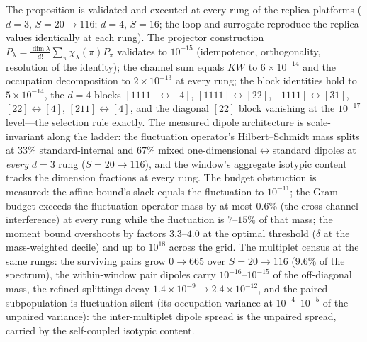The proposition is validated and executed at every rung of the replica
platforms ($d=3$, $S=20\to116$; $d=4$, $S=16$; the loop and surrogate
reproduce the replica values identically at each rung). The projector
construction $P_{\lambda}=\tfrac{\dim\lambda}{d!}\sum_{\pi}
\chi_{\lambda}(\pi)P_{\pi}$ validates to $10^{-15}$ (idempotence,
orthogonality, resolution of the identity); the channel sum equals $KW$
to $6\times10^{-14}$ and the occupation decomposition to
$2\times10^{-13}$ at every rung; the block identities hold to
$5\times10^{-14}$, the $d=4$ blocks $[1111]\leftrightarrow[4]$,
$[1111]\leftrightarrow[22]$, $[1111]\leftrightarrow[31]$,
$[22]\leftrightarrow[4]$, $[211]\leftrightarrow[4]$, and the diagonal
$[22]$ block vanishing at the $10^{-17}$ level---the selection rule
exactly. The measured dipole architecture is scale-invariant along the
ladder: the fluctuation operator's Hilbert--Schmidt mass splits at
$33\%$ standard-internal and $67\%$ mixed
one-dimensional$\leftrightarrow$standard dipoles at \emph{every} $d=3$
rung ($S=20\to116$), and the window's aggregate isotypic content tracks
the dimension fractions at every rung. The budget obstruction is
measured: the affine bound's slack equals the fluctuation to
$10^{-11}$; the Gram budget exceeds the fluctuation-operator mass by at
most $0.6\%$ (the cross-channel interference) at every rung while the
fluctuation is $7$--$15\%$ of that mass; the moment bound overshoots by
factors $3.3$--$4.0$ at the optimal threshold ($\delta$ at the
mass-weighted decile) and up to $10^{18}$ across the grid. The
multiplet census at the same rungs: the surviving pairs grow $0\to665$
over $S=20\to116$ ($9.6\%$ of the spectrum), the within-window pair
dipoles carry $10^{-16}$--$10^{-15}$ of the off-diagonal mass, the
refined splittings decay $1.4\times10^{-9}\to2.4\times10^{-12}$, and
the paired subpopulation is fluctuation-silent (its occupation variance
at $10^{-4}$--$10^{-5}$ of the unpaired variance): the inter-multiplet
dipole spread is the unpaired spread, carried by the self-coupled
isotypic content.


